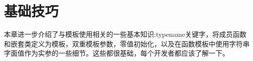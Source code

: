 \chapter{基础技巧}
本章进一步介绍了与模板使用相关的一些基本知识:typename关键字，将成员函数和嵌套类定义为模板，双重模板参数，零值初始化，以及在函数模板中使用字符串字面值作为实参的一些细节。这些都很基础，每个开发者都应该了解一下。







